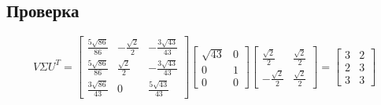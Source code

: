 \documentclass{article}
\begin{document}
  \subsection{Проверка}
  $$ V \Sigma U^T = \left[\begin{matrix}\frac{5 \sqrt{86}}{86} & - \frac{\sqrt{2}}{2} & - \frac{3 \sqrt{43}}{43}\\\frac{5 \sqrt{86}}{86} & \frac{\sqrt{2}}{2} & - \frac{3 \sqrt{43}}{43}\\\frac{3 \sqrt{86}}{43} & 0 & \frac{5 \sqrt{43}}{43}\end{matrix}\right] \left[\begin{matrix}\sqrt{43} & 0\\0 & 1\\0 & 0\end{matrix}\right] \left[\begin{matrix}\frac{\sqrt{2}}{2} & \frac{\sqrt{2}}{2}\\- \frac{\sqrt{2}}{2} & \frac{\sqrt{2}}{2}\end{matrix}\right] = \left[\begin{matrix}3 & 2\\2 & 3\\3 & 3\end{matrix}\right] $$
\end{document}
